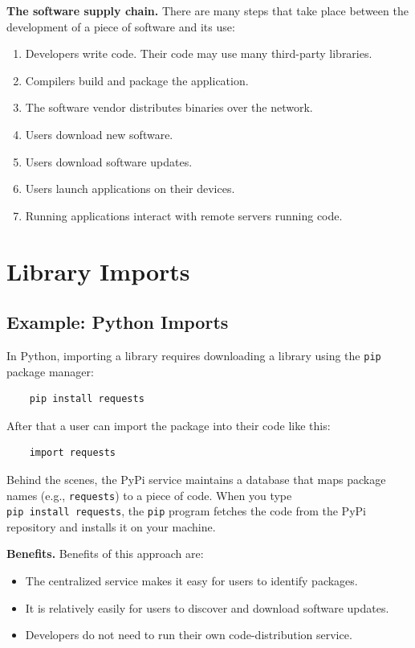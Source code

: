 \documentclass[
  letterpaper,
]{scrbook}
\providecommand{\tightlist}{%
  \setlength{\itemsep}{0pt}\setlength{\parskip}{0pt}}
\theoremstyle{definition}
\theoremstyle{plain}
\theoremstyle{plain}
\theoremstyle{remark}
\begin{document}
\textbf{The software supply chain.} There are many steps that take place
between the development of a piece of software and its use:

\begin{enumerate}
\def\labelenumi{\arabic{enumi}.}
\tightlist
\item
  Developers write code. Their code may use many third-party libraries.
\item
  Compilers build and package the application.
\item
  The software vendor distributes binaries over the network.
\item
  Users download new software.
\item
  Users download software updates.
\item
  Users launch applications on their devices.
\item
  Running applications interact with remote servers running code.
\end{enumerate}

\section{Library Imports}\label{library-imports}

\subsection{Example: Python Imports}\label{example-python-imports}

In Python, importing a library requires downloading a library using the
\texttt{pip} package manager:

\begin{verbatim}
    pip install requests
\end{verbatim}

After that a user can import the package into their code like this:

\begin{verbatim}
    import requests
\end{verbatim}

Behind the scenes, the PyPi service maintains a database that maps
package names (e.g., \texttt{requests}) to a piece of code. When you
type \texttt{pip\ install\ requests}, the \texttt{pip} program fetches
the code from the PyPi repository and installs it on your machine.

\textbf{Benefits.} Benefits of this approach are:

\begin{itemize}
\tightlist
\item
  The centralized service makes it easy for users to identify packages.
\item
  It is relatively easily for users to discover and download software
  updates.
\item
  Developers do not need to run their own code-distribution service.
\end{itemize}
\end{document}

